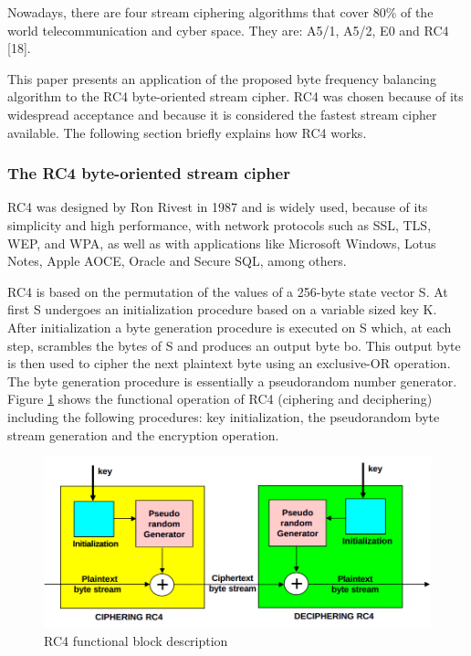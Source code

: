 \documentclass[conference]{IEEEtran}
\begin{document}
Nowadays, there are four stream ciphering algorithms that cover 80\% of the world telecommunication and cyber space. They are: A5/1, A5/2, E0 and RC4 [18].

This paper presents an application of the proposed byte frequency balancing algorithm to the RC4 byte-oriented stream cipher. RC4 was chosen because of its widespread acceptance and because it is considered the fastest stream cipher available. The following section briefly explains how RC4 works.


\subsubsection{The RC4 byte-oriented stream cipher}

RC4 \cite{william-stallings, gaithuru} was designed by Ron Rivest in 1987 and is widely used, because of its simplicity and high performance, with network protocols such as SSL, TLS, WEP, and WPA, as well as with applications like Microsoft Windows, Lotus Notes, Apple AOCE, Oracle and Secure SQL, among others. 

RC4 is based on the permutation of the values of a 256-byte state vector S. At first S undergoes an initialization procedure based on a variable sized key K. After initialization a byte generation procedure is executed on S which, at each step, scrambles the bytes of S and produces an output byte bo. This output byte is then used to cipher the next plaintext byte using an exclusive-OR operation. The byte generation procedure is essentially a pseudorandom number generator. Figure \ref{rc4-functioning} shows the functional operation of RC4 (ciphering and deciphering) including the following procedures: key initialization, the pseudorandom byte stream generation and the encryption operation.

\begin{figure}[!t]
	\centering
	\includegraphics[scale=0.3]{figure1}
	\caption{RC4 functional block description}
	\label{rc4-functioning}
\end{figure}
\end{document}
